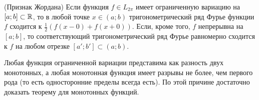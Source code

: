 \begin{theorem} (Признак Жордана)
	Если функция $f \in L_{2\pi}$ имеет ограниченную вариацию на $[a; b] \subset \mathbb{R}$, то в любой точке $x \in (a; b)$ тригонометрический ряд Фурье функции $f$ сходится к $\frac{1}{2}(f(x - 0) + f(x + 0))$. Если, кроме того, $f$ непрерывна на $[a; b]$, то соответствующий тригонометрический ряд Фурье равномерно сходится к $f$ на любом отрезке $[a'; b'] \subset (a; b)$.
\end{theorem}

\begin{reminder}
	Любая функция ограниченной вариации представима как разность двух монотонных, а любая монотонная функция имеет разрывы не более, чем первого рода (то есть односторонние пределы всегда есть). По этой причине достаточно доказать теорему для монотонных функций.
\end{reminder}

